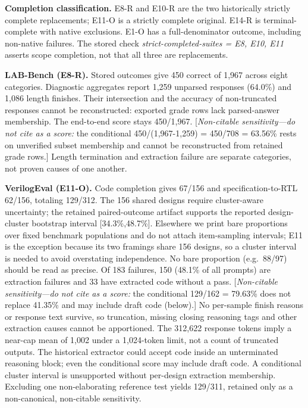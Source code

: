 \documentclass[a4paper,runningheads]{llncs}
\begin{document}
\textbf{Completion classification.} E8-R and E10-R are the two historically
strictly complete replacements; E11-O is a strictly complete original.
E14-R is terminal-complete with native exclusions. E1-O has a full-denominator
outcome, including non-native failures. The stored check
\emph{strict-completed-suites = E8, E10, E11} asserts scope completion,
not that all three are replacements.

\textbf{LAB-Bench (E8-R).} Stored outcomes give 450 correct of 1,967 across
eight categories. Diagnostic aggregates report 1,259 unparsed responses
(64.0\%) and 1,086 length finishes. Their intersection and the accuracy of
non-truncated responses cannot be reconstructed: exported grade rows lack
parsed-answer membership. The end-to-end score stays 450/1,967.
[\emph{Non-citable sensitivity---do not cite as a score:} the conditional
450/(1,967-1,259) = 450/708 = 63.56\% rests on unverified subset membership
and cannot be reconstructed from retained grade rows.] Length termination and extraction failure are
separate categories, not proven causes of one another.

\textbf{VerilogEval (E11-O).} Code completion gives 67/156 and
specification-to-RTL 62/156, totaling 129/312. The 156 shared designs require
cluster-aware uncertainty; the retained paired-outcome artifact supports the
reported design-cluster bootstrap interval [34.3\%,48.7\%]. Elsewhere we
print bare proportions over fixed benchmark populations and do not attach
item-sampling intervals; E11 is the exception because its two framings
share 156 designs, so a cluster interval is needed to avoid overstating
independence. No bare proportion (e.g.\ 88/97) should be read as precise. Of 183 failures,
150 (48.1\% of all prompts) are extraction failures and 33 have extracted code
without a pass. [\emph{Non-citable sensitivity---do not cite as a score:}
the conditional 129/162 = 79.63\% does not replace 41.35\% and may include
draft code (below).]
No per-sample finish reasons or response text survive, so truncation, missing
closing reasoning tags and other extraction causes cannot be apportioned.
The 312,622 response tokens imply a near-cap mean of 1,002 under a 1,024-token
limit, not a count of truncated outputs. The historical extractor could accept
code inside an unterminated reasoning block; even the conditional score may
include draft code. A conditional cluster interval is unsupported without
per-design extraction membership. Excluding one non-elaborating reference
test yields 129/311, retained only as a non-canonical, non-citable sensitivity.
\end{document}

